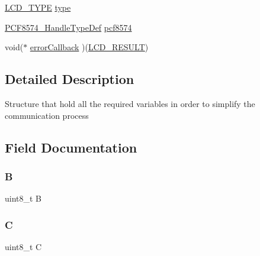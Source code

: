 \begin{DoxyCompactItemize}
\item 
\mbox{\hyperlink{hd44780_8h_a603ac2577e4d3b3e69f5295c8c984941}{L\+C\+D\+\_\+\+T\+Y\+PE}} \mbox{\hyperlink{struct_l_c_d___p_c_f8574___handle_type_def_aac64bc154c7d4ef59a73b2e858d24ad8}{type}}
\item 
\mbox{\hyperlink{struct_p_c_f8574___handle_type_def}{P\+C\+F8574\+\_\+\+Handle\+Type\+Def}} \mbox{\hyperlink{struct_l_c_d___p_c_f8574___handle_type_def_af2c4c02d88a37c806bbd69a38e925562}{pcf8574}}
\item 
void($\ast$ \mbox{\hyperlink{struct_l_c_d___p_c_f8574___handle_type_def_a35203c32dbe02ce7fca45bc8869b99a0}{error\+Callback}} )(\mbox{\hyperlink{hd44780_8h_addc817fafbc1e995a7d4c229c65dd6c0}{L\+C\+D\+\_\+\+R\+E\+S\+U\+LT}})
\end{DoxyCompactItemize}


\subsection{Detailed Description}
Structure that hold all the required variables in order to simplify the communication process 

\subsection{Field Documentation}
\mbox{\label{struct_l_c_d___p_c_f8574___handle_type_def_a7c7fb36d372d349a62c14f1e6c7337ea}} 
\subsubsection{\texorpdfstring{B}{B}}
{\footnotesize\ttfamily uint8\+\_\+t B}

\mbox{\label{struct_l_c_d___p_c_f8574___handle_type_def_a6f32a714c227b07e27db3e599edb419a}} 
\subsubsection{\texorpdfstring{C}{C}}
{\footnotesize\ttfamily uint8\+\_\+t C}

\mbox{\label{struct_l_c_d___p_c_f8574___handle_type_def_a42ede28e876dcdb2ce2ddd730de0401e}} 
